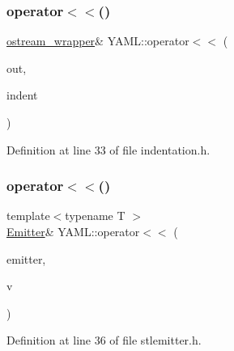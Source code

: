 \subsubsection{\texorpdfstring{operator$<$$<$()}{operator<<()}\hspace{0.1cm}{\footnotesize\ttfamily [6/35]}}
{\footnotesize\ttfamily \mbox{\hyperlink{class_y_a_m_l_1_1ostream__wrapper}{ostream\+\_\+wrapper}}\& Y\+A\+M\+L\+::operator$<$$<$ (\begin{DoxyParamCaption}\item[{\mbox{\hyperlink{class_y_a_m_l_1_1ostream__wrapper}{ostream\+\_\+wrapper}} \&}]{out,  }\item[{const \mbox{\hyperlink{struct_y_a_m_l_1_1_indent_to}{Indent\+To}} \&}]{indent }\end{DoxyParamCaption})\hspace{0.3cm}{\ttfamily [inline]}}



Definition at line 33 of file indentation.\+h.

\mbox{\label{namespace_y_a_m_l_a5d9f3850631942c28fa6455067269e60}} 
\subsubsection{\texorpdfstring{operator$<$$<$()}{operator<<()}\hspace{0.1cm}{\footnotesize\ttfamily [7/35]}}
{\footnotesize\ttfamily template$<$typename T $>$ \\
\mbox{\hyperlink{class_y_a_m_l_1_1_emitter}{Emitter}}\& Y\+A\+M\+L\+::operator$<$$<$ (\begin{DoxyParamCaption}\item[{\mbox{\hyperlink{class_y_a_m_l_1_1_emitter}{Emitter}} \&}]{emitter,  }\item[{const std\+::set$<$ T $>$ \&}]{v }\end{DoxyParamCaption})\hspace{0.3cm}{\ttfamily [inline]}}



Definition at line 36 of file stlemitter.\+h.

\mbox{\label{namespace_y_a_m_l_a64496783db5f3d6c1dd7449ffafcf361}} 

